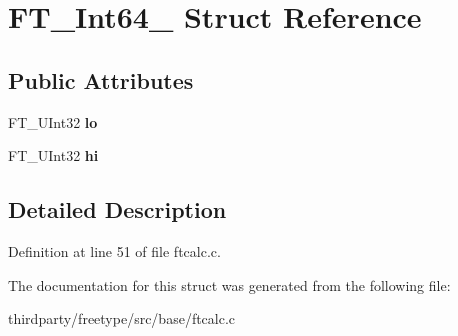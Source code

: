 \hypertarget{struct_f_t___int64__}{}\section{F\+T\+\_\+\+Int64\+\_\+ Struct Reference}
\label{struct_f_t___int64__}
\subsection*{Public Attributes}
\begin{DoxyCompactItemize}
\item 
\mbox{\label{struct_f_t___int64___a19485f29df4af00e82b1588232290794}} 
F\+T\+\_\+\+U\+Int32 {\bfseries lo}
\item 
\mbox{\label{struct_f_t___int64___a92d342fe6bbdf97548304aaba6c27410}} 
F\+T\+\_\+\+U\+Int32 {\bfseries hi}
\end{DoxyCompactItemize}


\subsection{Detailed Description}


Definition at line 51 of file ftcalc.\+c.



The documentation for this struct was generated from the following file\+:\begin{DoxyCompactItemize}
\item 
thirdparty/freetype/src/base/ftcalc.\+c\end{DoxyCompactItemize}
